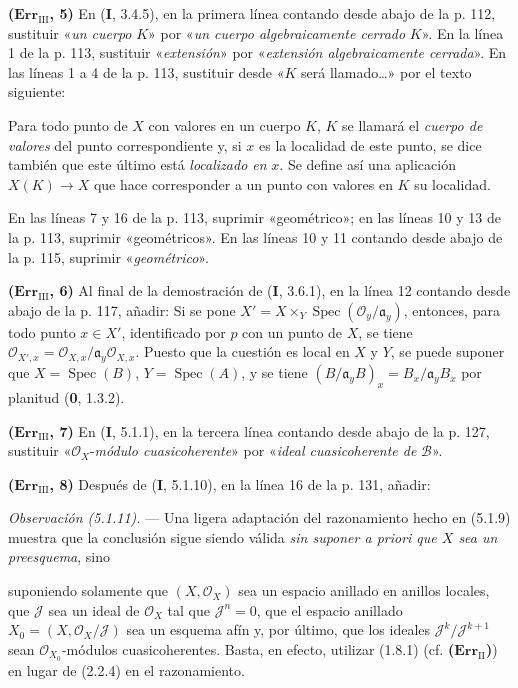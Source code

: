 \documentclass[10pt,oneside]{book}
\newcommand{\oldpage}[2][]{\setcounter{footnote}{0}\marginpar{\scriptsize\textbf{#1}~|~#2}\ignorespaces}
\begin{document}
\noindent\textbf{($\mathbf{Err}_{\mathrm{III}}$, 5)} En (\textbf I, 3.4.5), en la
primera línea contando desde abajo de la p. 112, sustituir «\emph{un cuerpo}
$K$» por «\emph{un cuerpo algebraicamente cerrado} $K$». En la línea 1 de la
p. 113, sustituir «\emph{extensión}» por «\emph{extensión algebraicamente
cerrada}». En las líneas 1 a 4 de la p. 113, sustituir desde «$K$ será
llamado\ldots{}» por el texto siguiente:

Para todo punto de $X$ con valores en un cuerpo $K$, $K$ se llamará el
\emph{cuerpo de valores} del punto correspondiente y, si $x$ es la localidad
de este punto, se dice también que este último está \emph{localizado en} $x$.
Se define así una aplicación $X(K)\to X$ que hace corresponder a un punto con
valores en $K$ su localidad.

En las líneas 7 y 16 de la p. 113, suprimir «geométrico»; en las líneas 10 y 13
de la p. 113, suprimir «geométricos». En las líneas 10 y 11 contando desde
abajo de la p. 115, suprimir «\emph{geométrico}».

\noindent\textbf{($\mathbf{Err}_{\mathrm{III}}$, 6)} Al final de la
demostración de (\textbf I, 3.6.1), en la línea 12 contando desde abajo de la p. 117,
añadir: Si se pone
$X'=X\times_Y\operatorname{Spec}(\mathscr O_y/\mathfrak a_y)$, entonces, para
todo punto $x\in X'$, identificado por $p$ con un punto de $X$, se tiene
$\mathscr O_{X',x}=\mathscr O_{X,x}/\mathfrak a_y\mathscr O_{X,x}$. Puesto que
la cuestión es local en $X$ y $Y$, se puede suponer que
$X=\operatorname{Spec}(B)$, $Y=\operatorname{Spec}(A)$, y se tiene
$(B/\mathfrak a_yB)_x=B_x/\mathfrak a_yB_x$ por planitud (\textbf{0}, 1.3.2).

\noindent\textbf{($\mathbf{Err}_{\mathrm{III}}$, 7)} En (\textbf I, 5.1.1), en la
tercera línea contando desde abajo de la p. 127, sustituir
«$\mathscr O_X$-\emph{módulo cuasicoherente}» por «\emph{ideal cuasicoherente de}
$\mathscr B$».

\noindent\textbf{($\mathbf{Err}_{\mathrm{III}}$, 8)} Después de (\textbf I, 5.1.10),
en la línea 16 de la p. 131, añadir:

\emph{Observación (5.1.11).} --- Una ligera adaptación del razonamiento hecho
en (5.1.9) muestra que la conclusión sigue siendo válida \emph{sin suponer a
priori que $X$ sea un preesquema}, sino

\oldpage[III]{220}
suponiendo solamente que $(X,\mathscr O_X)$ sea un espacio anillado en anillos
locales, que $\mathscr J$ sea un ideal de $\mathscr O_X$ tal que
$\mathscr J^n=0$, que el espacio anillado
$X_0=(X,\mathscr O_X/\mathscr J)$ sea un esquema afín y, por último, que los
ideales $\mathscr J^k/\mathscr J^{k+1}$ sean $\mathscr O_{X_0}$-módulos
cuasicoherentes. Basta, en efecto, utilizar (1.8.1) (cf.
\textbf{($\mathbf{Err}_{\mathrm{II}}$)}) en lugar de (2.2.4) en el razonamiento.
\end{document}

